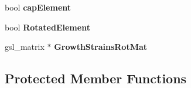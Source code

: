 \begin{DoxyCompactItemize}
\item 
\hypertarget{classShapeBase_a21420915ac7c8444e0e5b5f4e98d7322}{}bool {\bfseries cap\+Element}\label{classShapeBase_a21420915ac7c8444e0e5b5f4e98d7322}

\item 
\hypertarget{classShapeBase_af64f900d51cec3e48a488fdd8a51eacf}{}bool {\bfseries Rotated\+Element}\label{classShapeBase_af64f900d51cec3e48a488fdd8a51eacf}

\item 
\hypertarget{classShapeBase_acc1408c3e89b91787fec7e913cac1f58}{}gsl\+\_\+matrix $\ast$ {\bfseries Growth\+Strains\+Rot\+Mat}\label{classShapeBase_acc1408c3e89b91787fec7e913cac1f58}

\end{DoxyCompactItemize}
\subsection*{Protected Member Functions}
